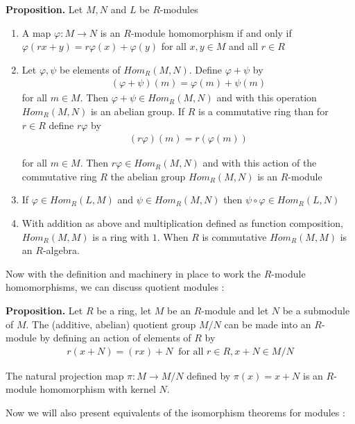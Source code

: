 \documentclass[11pt, reqno]{amsart}
\theoremstyle{plain}
\theoremstyle{definition}
\theoremstyle{example}
\begin{document}
\par
\textbf{Proposition.} Let $M, N$ and $L$ be $R$-modules
\begin{enumerate}
\item A map $\varphi: M \to N$ is an $R$-module homomorphism if and only if $\varphi(rx + y) =r\varphi(x) + \varphi(y)$ for all $x, y \in M$ and all $r \in R$
\item Let $\varphi, \psi$ be elements of $Hom_R(M,N)$. Define $\varphi + \psi$ by
\begin{align*}
(\varphi + \psi)(m) = \varphi(m) + \psi(m)
\end{align*}
for all $m \in M$. Then $\varphi + \psi \in Hom_R(M, N)$ and with this operation $Hom_R(M, N)$ is an abelian group. If $R$ is a commutative ring than for $r \in R$ define $r\varphi$ by 
\begin{align*}
(r\varphi)(m) = r(\varphi(m))
\end{align*}

for all $m \in M$. Then $r\varphi \in Hom_R(M, N)$ and with this action of the commutative ring $R$ the abelian group $Hom_R(M, N)$ is an $R$-module
\item If $\varphi \in Hom_R(L, M)$ and $\psi \in Hom_R(M, N)$ then $\psi \circ \varphi \in Hom_R(L, N)$
\item With addition as above and multiplication defined as function composition, $Hom_R(M, M)$ is a ring with $1$. When $R$ is commutative $Hom_R(M, M)$ is an $R$-algebra.
\end{enumerate}

Now with the definition and machinery in place to work the $R$-module homomorphisms, we can discuss quotient modules \cite[\S 10.2, p. 348]{dummit}:

\par
\textbf{Proposition.} Let $R$ be a ring, let $M$ be an $R$-module and let $N$ be a submodule of $M$. The (additive, abelian) quotient group $M/N$ can be made into an $R$-module by defining an action of elements of $R$ by
\begin{align*}
r(x+N) = (rx) + N \; \; \text{for all } r \in R, x+N \in M/N
\end{align*}

The natural projection map $\pi: M \to M/N$ defined by $\pi(x) = x + N$ is an $R$-module homomorphism with kernel $N$.

\par
Now we will also present equivalents of the isomorphism theorems for modules \cite[\S 10.2, p. 345]{dummit}:
\end{document}
